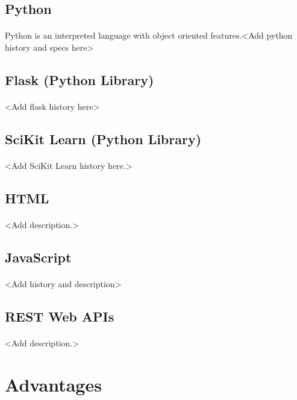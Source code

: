 \subsection{Python}
\paragraph{}
Python is an interpreted language with object oriented features.<Add python history and specs here>
\subsection{Flask (Python Library)}
\paragraph{}
<Add flask history here>
\subsection{SciKit Learn (Python Library)}
\paragraph{}
<Add SciKit Learn history here.>
\subsection{HTML}
\paragraph{}
<Add description.>
\subsection{JavaScript}
\paragraph{}
<Add history and description>
\subsection{REST Web APIs}
\paragraph{}
<Add description.>

\section{Advantages}

